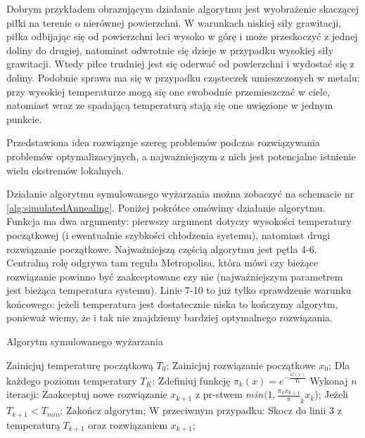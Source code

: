\documentclass{pracamgr}
\begin{document}
Dobrym przykładem obrazującym działanie algorytmu jest wyobrażenie skaczącej piłki na terenie 
o nierównej powierzchni.
W warunkach niskiej siły grawitacji, piłka odbijając się od powierzchni leci wysoko w górę i może
przeskoczyć z jednej doliny do drugiej, natomiast odwrotnie się dzieje w przypadku wysokiej siły
grawitacji. Wtedy piłce trudniej jest się oderwać od powierzchni i wydostać się z doliny. Podobnie
sprawa ma się w przypadku cząsteczek umieszczonych w metalu: przy wysokiej 
temperaturze mogą się one swobodnie przemieszczać w ciele, natomiast wraz ze spadającą temperaturą 
stają się one uwięzione w jednym punkcie.

Przedstawiona idea rozwiązuje szereg problemów podczas rozwiązywania problemów optymalizacyjnych, a 
najważniejszym z nich jest potencjalne istnienie wielu ekstremów lokalnych.


Działanie algorytmu symulowanego wyżarzania można zobaczyć na schemacie nr 
\ref{alg:simulatedAnnealing}. Poniżej pokrótce omówimy działanie algorytmu.
Funkcja ma dwa argumenty: pierwszy argument dotyczy wysokości temperatury początkowej (i ewentualnie
szybkości chłodzenia systemu), natomiast drugi rozwiązanie początkowe.
Najważniejszą częścią algorytmu jest pętla 4-6. 
Centralną rolę odgrywa tam reguła Metropolisa, która mówi czy bieżące rozwiązanie powinno być 
zaakceptowane czy nie (najważniejszym parametrem jest bieżąca temperatura systemu). 
Linie 7-10 to już tylko sprawdzenie warunku końcowego: jeżeli temperatura jest dostatecznie 
niska to kończymy algorytm, ponieważ wiemy, że i tak nie znajdziemy bardziej optymalnego rozwiązania.


\begin{algorithm}[H]
\caption{Algorytm symulowanego wyżarzania}\label{euclid}

\begin{algorithmic}[1]
  
  \State Zainicjuj temperaturę początkową $T_0$;
  \State Zainicjuj rozwiązanie początkowe $x_0$;
  \State Dla każdego poziomu temperatury $T_K$:
  \State  \hspace{\algorithmicindent} Zdefiniuj funkcję $\pi_k(x) = e^{- \frac{G(x)}{T_k}}$
  \State  \hspace{\algorithmicindent}    Wykonaj $n$ iteracji:
  \State    \hspace{\algorithmicindent} \hspace{\algorithmicindent}       Zaakceptuj nowe rozwiązanie $x_{k+1}$ z pr-stwem $min(1, \frac{\pi_k{x_{k+1}}}\pi_k{{x_{k}}}$);
  \State Jeżeli $T_{k+1} < T_{min}$:
  \State  \hspace{\algorithmicindent}    Zakończ algorytm;
  \State W przeciwnym przypadku:
  \State   \hspace{\algorithmicindent}   Skocz do linii 3 z temperaturą $T_{k+1}$ oraz rozwiązaniem $x_{k+1}$;

\end{algorithmic}
\label{alg:simulatedAnnealing}
\end{algorithm}
\end{document}
